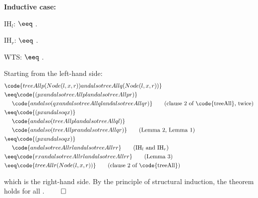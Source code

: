 \begin{parts}
\begin{solutionorbox}[40em]
      \vspace{6pt}
      \textbf{Inductive case:} 

      \noindent IH$_l$:  $\eeq$
      .

      \noindent IH$_r$:  $\eeq$
      .

      \noindent WTS:
       $\eeq$
      .

      \vspace{4pt}
      Starting from the left-hand side:
      \begin{align*}
        & \code{treeAll p (Node (l,x,r)) andalso treeAll q (Node (l,x,r))} \\
        &\eeq \code{(p x andalso treeAll p l andalso treeAll p r)} \\
        & \quad\; \code{andalso (q x andalso treeAll q l andalso treeAll q r)}
          \tag{clause 2 of \code{treeAll}, twice} \\
        &\eeq \code{(p x andalso q x)} \\
        & \quad\; \code{andalso (treeAll p l andalso treeAll q l)} \\
        & \quad\; \code{andalso (treeAll p r andalso treeAll q r)}
          \tag{Lemma 2, Lemma 1} \\
        &\eeq \code{(p x andalso q x)} \\
        & \quad\; \code{andalso treeAll r l andalso treeAll r r}
          \tag{IH$_l$ and IH$_r$} \\
        &\eeq \code{r x andalso treeAll r l andalso treeAll r r}
          \tag{Lemma 3} \\
        &\eeq \code{treeAll r (Node (l,x,r))}
          \tag{clause 2 of \code{treeAll}}
      \end{align*}

      which is the right-hand side. By the principle of structural induction, the
      theorem holds for all . $\qed$
    \end{solutionorbox}
\end{parts}
